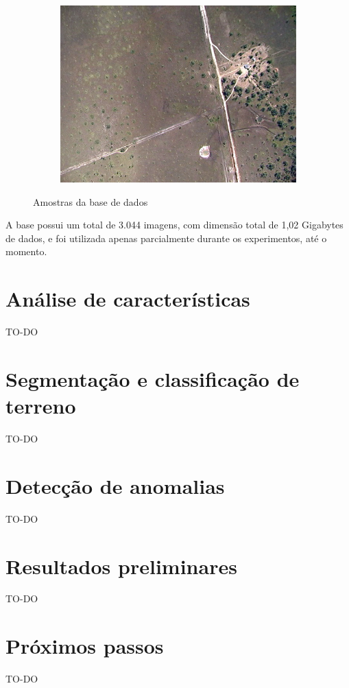 \begin{figure}
\begin{subfigure}[b]{0.3\textwidth}
    \includegraphics[width=\textwidth]{imgs/amostra3}
  \end{subfigure}%
  \caption{Amostras da base de dados}
  \label{fig:amostra}
\end{figure}

A base possui um total de 3.044 imagens, com dimensão total de 1,02 Gigabytes de dados, e foi utilizada apenas parcialmente durante os experimentos, até o momento.

\section{Análise de características}

TO-DO

\section{Segmentação e classificação de terreno}

TO-DO

\section{Detecção de anomalias}

TO-DO

\section{Resultados preliminares}

TO-DO

\section{Próximos passos}

TO-DO